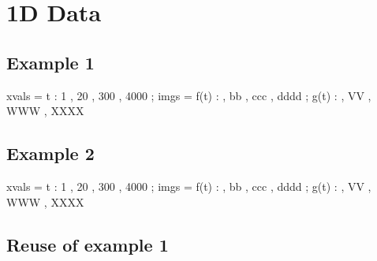 \documentclass[12pt]{article}
\begin{document}


\section{1D Data}

\subsection{Example 1}

\begin{functable}
    xvals =    t : 1 , 20 , 300 , 4000 ;
    imgs  = f(t) :  , bb , ccc , dddd ;
            g(t) :  , VV , WWW , XXXX
\end{functable}


\subsection{Example 2}

\begin{functable}
    xvals =    t : 1 , 20 , 300 , 4000 ;
    imgs  = f(t) :  , bb , ccc , dddd ;
            g(t) :  , VV , WWW , XXXX
\end{functable}


\subsection{Reuse of example 1}

\begin{functable}[1]
\end{functable}


\end{document}
